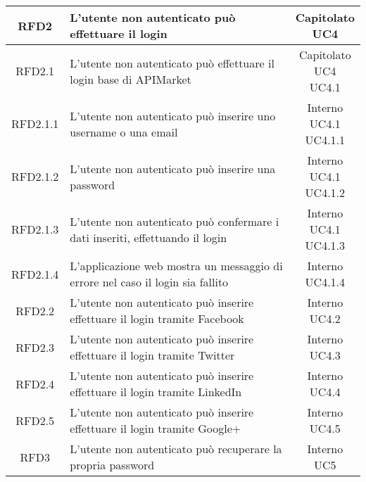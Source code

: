 \begin{longtable}{|c|m{8cm}|c|}
RFD2 & L'utente non autenticato può effettuare il login & \makecell*{Capitolato\\UC4} \\
\hline

RFD2.1 & L'utente non autenticato può effettuare il login base di APIMarket & \makecell*{Capitolato\\UC4\\UC4.1} \\
\hline

RFD2.1.1 & L'utente non autenticato può inserire uno username o una email & \makecell*{Interno\\UC4.1\\UC4.1.1} \\
\hline
RFD2.1.2 & L'utente non autenticato può inserire una password & \makecell*{Interno\\UC4.1\\UC4.1.2} \\
\hline
RFD2.1.3 & L'utente non autenticato può confermare i dati inseriti, effettuando il login & \makecell*{Interno\\UC4.1\\UC4.1.3} \\
\hline
RFD2.1.4 & L'applicazione web mostra un messaggio di errore nel caso il login sia fallito & \makecell*{Interno\\UC4.1.4} \\
\hline

RFD2.2 & L'utente non autenticato può inserire effettuare il login tramite Facebook & \makecell*{Interno\\UC4.2} \\
\hline
RFD2.3 & L'utente non autenticato può inserire effettuare il login tramite Twitter & \makecell*{Interno\\UC4.3} \\
\hline
RFD2.4 & L'utente non autenticato può inserire effettuare il login tramite LinkedIn & \makecell*{Interno\\UC4.4} \\
\hline
RFD2.5 & L'utente non autenticato può inserire effettuare il login tramite Google+ & \makecell*{Interno\\UC4.5} \\
\hline

RFD3 & L'utente non autenticato può recuperare la propria password & \makecell*{Interno\\UC5} \\
\hline


\end{longtable}
